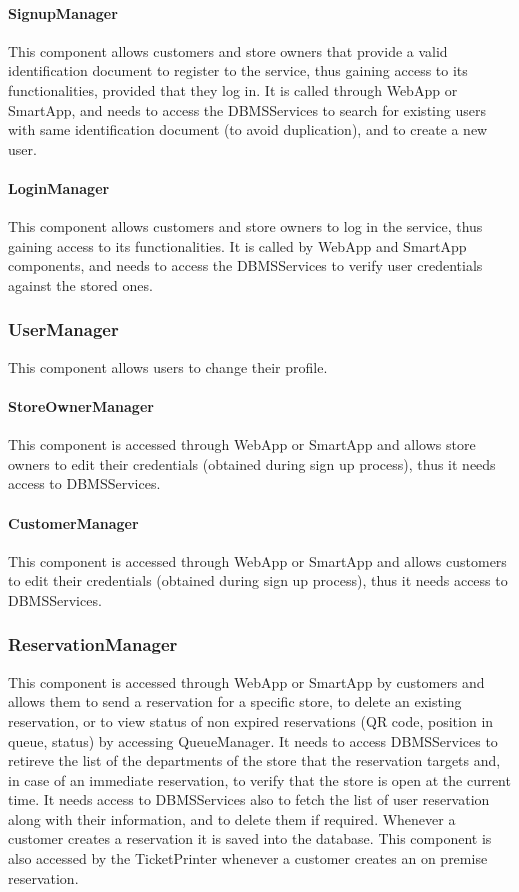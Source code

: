 \paragraph{SignupManager}
This component allows customers and store owners that provide a valid identification document to register to the service, thus gaining access to its functionalities, provided that they log in. It is called through WebApp or SmartApp, and needs to access the DBMSServices to search for existing users with same identification document (to avoid duplication), and to create a new user.
\paragraph{LoginManager}
This component allows customers and store owners to log in the service, thus gaining access to its functionalities. It is called by WebApp and SmartApp components, and needs to access the DBMSServices to verify user credentials against the stored ones.
\subsubsection{UserManager}
This component allows users to change their profile.
\paragraph{StoreOwnerManager}
This component is accessed through WebApp or SmartApp and allows store owners to edit their credentials (obtained during sign up process), thus it needs access to DBMSServices.
\paragraph{CustomerManager}
This component is accessed through WebApp or SmartApp and allows customers to edit their credentials (obtained during sign up process), thus it needs access to DBMSServices.
\subsubsection{ReservationManager}
This component is accessed through WebApp or SmartApp by customers and allows them to send a reservation for a specific store, to delete an existing reservation, or to view status of non expired reservations (QR code, position in queue, status) by accessing QueueManager. It needs to access DBMSServices to retireve the list of the departments of the store that the reservation targets and, in case of an immediate reservation, to verify that the store is open at the current time. It needs access to DBMSServices also to fetch the list of user reservation along with their information, and to delete them if required. Whenever a customer creates a reservation it is saved into the database. This component is also accessed by the TicketPrinter whenever a customer creates an on premise reservation.
